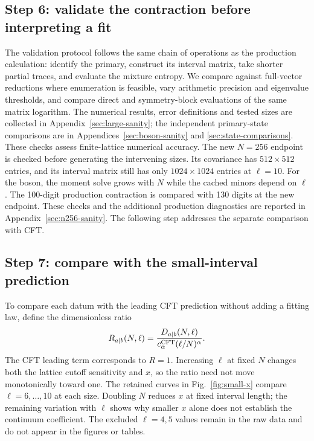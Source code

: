 \subsection{Step 6: validate the contraction before interpreting a fit}
\label{sec:large-validation-method}
The validation protocol follows the same chain of operations as the
production calculation: identify the primary, construct its interval
matrix, take shorter partial traces, and evaluate the mixture entropy.
We compare against full-vector reductions where enumeration is feasible,
vary arithmetic precision and eigenvalue thresholds, and compare direct
and symmetry-block evaluations of the same matrix logarithm.
The numerical results, error definitions and tested sizes are collected
in Appendix~\ref{sec:large-sanity}; the independent primary-state
comparisons are in Appendices~\ref{sec:boson-sanity} and
\ref{sec:state-comparisons}. These checks assess finite-lattice numerical
accuracy. The new $N=256$ endpoint is checked before generating the
intervening sizes. Its covariance has $512\times512$ entries, and its
interval matrix still has only $1024\times1024$ entries at $\ell=10$.
For the boson, the moment solve grows with $N$ while the cached minors
depend on $\ell$. The 100-digit production contraction is compared
with 130 digits at the new endpoint. These checks and the additional
production diagnostics are reported in Appendix~\ref{sec:n256-sanity}.
The following step addresses the separate comparison with CFT.

\subsection{Step 7: compare with the small-interval prediction}
\label{sec:large-cft-comparison}
To compare each datum with the leading CFT prediction without adding a
fitting law, define the dimensionless ratio
\begin{equation}
 R_{a\mid b}(N,\ell)=
 \frac{D_{a\mid b}(N,\ell)}{c_\alpha^{\rm CFT}(\ell/N)^\alpha}.
 \label{eq:small-x-ratio}
\end{equation}
The CFT leading term corresponds to $R=1$. Increasing $\ell$ at fixed
$N$ changes both the lattice cutoff sensitivity and $x$, so the ratio
need not move monotonically toward one. The retained curves in
Fig.~\ref{fig:small-x} compare $\ell=6,\ldots,10$ at each size.
Doubling $N$ reduces $x$ at fixed interval length; the remaining
variation with $\ell$ shows why smaller $x$ alone does not establish
the continuum coefficient. The excluded $\ell=4,5$ values remain
in the raw data and do not appear in the figures or tables.

